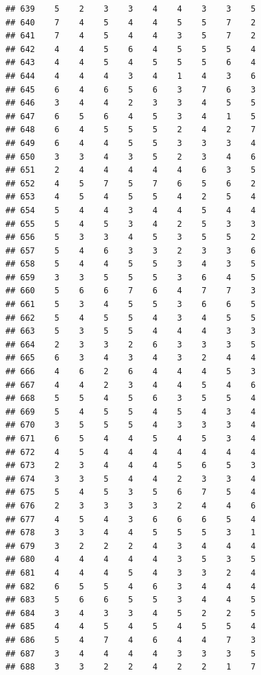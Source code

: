 \documentclass[
]{article}
\begin{document}
\begin{verbatim}
## 639    5    2    3    3    4    4    3    3    5
## 640    7    4    5    4    4    5    5    7    2
## 641    7    4    5    4    4    3    5    7    2
## 642    4    4    5    6    4    5    5    5    4
## 643    4    4    5    4    5    5    5    6    4
## 644    4    4    4    3    4    1    4    3    6
## 645    6    4    6    5    6    3    7    6    3
## 646    3    4    4    2    3    3    4    5    5
## 647    6    5    6    4    5    3    4    1    5
## 648    6    4    5    5    5    2    4    2    7
## 649    6    4    4    5    5    3    3    3    4
## 650    3    3    4    3    5    2    3    4    6
## 651    2    4    4    4    4    4    6    3    5
## 652    4    5    7    5    7    6    5    6    2
## 653    4    5    4    5    5    4    2    5    4
## 654    5    4    4    3    4    4    5    4    4
## 655    5    4    5    3    4    2    5    3    3
## 656    5    3    3    4    5    3    5    5    2
## 657    5    4    6    3    3    2    3    3    6
## 658    5    4    4    5    5    3    4    3    5
## 659    3    3    5    5    5    3    6    4    5
## 660    5    6    6    7    6    4    7    7    3
## 661    5    3    4    5    5    3    6    6    5
## 662    5    4    5    5    4    3    4    5    5
## 663    5    3    5    5    4    4    4    3    3
## 664    2    3    3    2    6    3    3    3    5
## 665    6    3    4    3    4    3    2    4    4
## 666    4    6    2    6    4    4    4    5    3
## 667    4    4    2    3    4    4    5    4    6
## 668    5    5    4    5    6    3    5    5    4
## 669    5    4    5    5    4    5    4    3    4
## 670    3    5    5    5    4    3    3    3    4
## 671    6    5    4    4    5    4    5    3    4
## 672    4    5    4    4    4    4    4    4    4
## 673    2    3    4    4    4    5    6    5    3
## 674    3    3    5    4    4    2    3    3    4
## 675    5    4    5    3    5    6    7    5    4
## 676    2    3    3    3    3    2    4    4    6
## 677    4    5    4    3    6    6    6    5    4
## 678    3    3    4    4    5    5    5    3    1
## 679    3    2    2    2    4    3    4    4    4
## 680    4    4    4    4    4    3    5    3    5
## 681    4    4    4    5    4    3    3    2    4
## 682    6    5    5    4    6    3    4    4    4
## 683    5    6    6    5    5    3    4    4    5
## 684    3    4    3    3    4    5    2    2    5
## 685    4    4    5    4    5    4    5    5    4
## 686    5    4    7    4    6    4    4    7    3
## 687    3    4    4    4    4    3    3    3    5
## 688    3    3    2    2    4    2    2    1    7

\end{verbatim}
\end{document}
